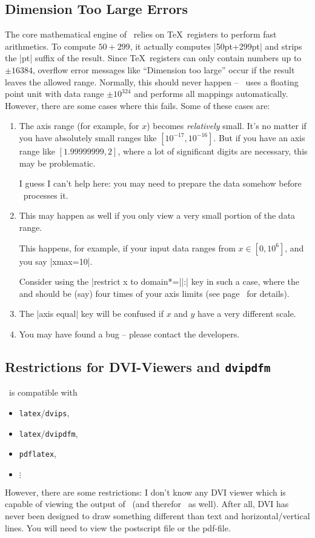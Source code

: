\subsection{Dimension Too Large Errors}
The core mathematical engine of \PGF\ relies on \TeX\ registers to perform fast arithmetics. To compute $50+299$, it actually computes |50pt+299pt| and strips the |pt| suffix of the result. Since \TeX\ registers can only contain numbers up to $\pm 16384$, overflow error messages like ``Dimension too large'' occur if the result leaves the allowed range. Normally, this should never happen -- \PGFPlots\ uses a floating point unit with data range $\pm 10^{324}$ and performs all mappings automatically. However, there are some cases where this fails. Some of these cases are:
\begin{enumerate}
	\item The axis range (for example, for $x$) becomes \emph{relatively} small. It's no matter if you have absolutely small ranges like $[10^{-17},10^{-16}]$. But if you have an axis range like $[1.99999999,2]$, where a lot of significant digits are necessary, this may be problematic.

	I guess I can't help here: you may need to prepare the data somehow before \PGFPlots\ processes it.

	\item This may happen as well if you only view a very small portion of the data range.

	This happens, for example, if your input data ranges from $x\in [0,10^6]$, and you say |xmax=10|.

	Consider using the |restrict x to domain*=||:| key in such a case, where the  and  should be (say) four times of your axis limits (see page~\pageref{key:restrict:x:to:domain} for details).
		
	\item The |axis equal| key will be confused if $x$ and $y$ have a very different scale.
	\item You may have found a bug -- please contact the developers.
\end{enumerate}

\subsection{Restrictions for DVI-Viewers and \texttt{dvipdfm}}
\label{sec:drivers}%
\PGF\ is compatible with
\begin{itemize}
	\item \lstinline!latex!/\lstinline!dvips!,
	\item \lstinline!latex!/\lstinline!dvipdfm!,
	\item \lstinline!pdflatex!,
	\item $\vdots$
\end{itemize}
However, there are some restrictions: I don't know any DVI viewer which is capable of viewing the output of \PGF\ (and therefor \PGFPlots\ as well). After all, DVI has never been designed to draw something different than text and horizontal/vertical lines. You will need to view the postscript file or the pdf-file.

